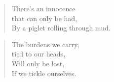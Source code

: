 \documentclass[titlepage]{article}
\begin{document}

\begin{verse}
    There's an innocence \\
    \breathe that can only be had, \\
    By a piglet rolling through mud.
\end{verse}

\begin{verse}
    The burdens we carry, \\
    \breathe tied to our heads, \\
    Will only be lost, \\
    If we tickle ourselves.
\end{verse}
\end{document}

